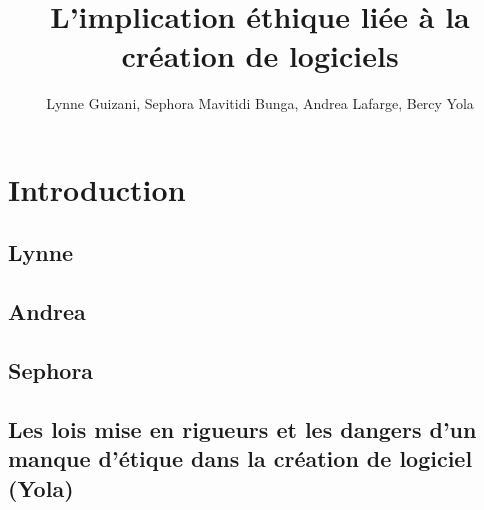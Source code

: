 \documentclass{article}
\title{L'implication éthique liée à la création de logiciels}
\author{Lynne Guizani, Sephora Mavitidi Bunga, Andrea Lafarge, Bercy Yola}
\begin{document}
\maketitle

\section{Introduction}

\subsection{Lynne}

\subsection{Andrea}


\subsection{Sephora}


\subsection{Les lois mise en rigueurs et les dangers d'un manque d'étique dans la création de logiciel (Yola)}
\end{document}
